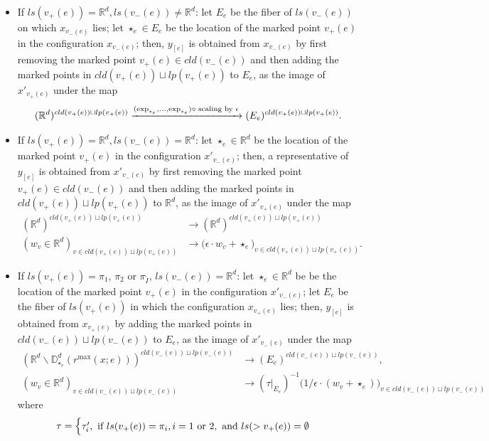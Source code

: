 \documentclass[11pt]{article}
\theoremstyle{definition}
\theoremstyle{remark}
\def\R{\mathbb{R}}
\def\D{\mathbb{D}}
\def\rI{{\mathring{I}}}
\def\tn#1{\textnormal{#1}}
\begin{document}
\begin{itemize}
\item If $ls(v_+(e))=\R^d, ls(v_-(e))\neq\R^d$:
let $E_e$ be the fiber of $ls(v_-(e))$ on which $x_{v_-(e)}$ lies;
let $\star_e\in E_e$ be the location of the marked point $v_+(e)$ in the configuration $x_{v_-(e)}$; 
then, 
$y_{[e]}$ is obtained from $x_{v_-(e)}$ by first removing the marked point $v_+(e)\in cld(v_-(e))$ and then adding the marked points in $cld(v_+(e))\sqcup lp(v_+(e))$ to $E_e$, as the image of $x'_{v_+(e)}$ under the map
$$(\R^d)^{cld(v_+(e))\sqcup lp(v_+(e))}\xrightarrow{(\exp_{\star_e},\ldots,\exp_{\star_e})\circ\tn{ scaling by }\epsilon}(E_e)^{cld(v_+(e))\sqcup lp(v_+(e))}.$$
\item If $ls(v_+(e))=\R^d, ls(v_-(e))=\R^d$: let $\star_e\in \R^d$ be the location of the marked point $v_+(e)$ in the configuration $x'_{v_-(e)}$; then, 
a representative of $y_{[e]}$ is obtained from $x'_{v_-(e)}$ by first removing the marked point $v_+(e)\in cld(v_-(e))$ and then adding the marked points in $cld(v_+(e))\sqcup lp(v_+(e))$ to $\R^d$, as the image of $x'_{v_+(e)}$ under the map
\begin{align*}
(\R^d)^{cld(v_+(e))\sqcup lp(v_+(e))}&\longrightarrow(\R^d)^{cld(v_+(e))\sqcup lp(v_+(e))}\\
(w_v\in\R^d)_{v\in cld(v_+(e))\sqcup lp(v_+(e))}&\longrightarrow\big(\epsilon\cdot w_v+\star_e\big)_{v\in cld(v_+(e))\sqcup lp(v_+(e))}.
\end{align*}
\item If $ls(v_+(e))=\pi_1$, $\pi_2$ or $\pi_\rI$, $ls(v_-(e))=\R^d$:  
let $\star_e\in\R^d$ be be the location of the marked point $v_+(e)$ in the configuration $x'_{v_-(e)}$; 
let $E_e$ be the fiber of $ls(v_+(e))$ in which the configuration $x_{v_+(e)}$ lies; then, 
$y_{[e]}$ is obtained from $x_{v_+(e)}$ by adding the marked points in $cld(v_-(e))\sqcup lp(v_-(e))$ to $E_e$, as the image of $x'_{v_-(e)}$ under the map
\begin{align*}
(\R^d\backslash\D^d_{\star_e}(r^{\max}(x;e)))^{cld(v_-(e))\sqcup lp(v_-(e))}&\longrightarrow(E_e)^{cld(v_-(e))\sqcup lp(v_-(e))},\\
(w_v\in\R^d)_{v\in cld(v_-(e))\sqcup lp(v_-(e))}&\to (\tau|_{E_e})^{-1}\big(1/\epsilon\cdot(w_v+\star_e)\big)_{v\in cld(v_-(e))\sqcup lp(v_-(e))}
\end{align*}
where 
$$\tau=\begin{cases}
\tau'_i, \tn{ if }ls(v_+(e))=\pi_i, i=1 \tn{ or } 2, \tn{ and } ls(>v_+(e))=\emptyset \\

\end{cases}$$
\end{itemize}
\end{document}
